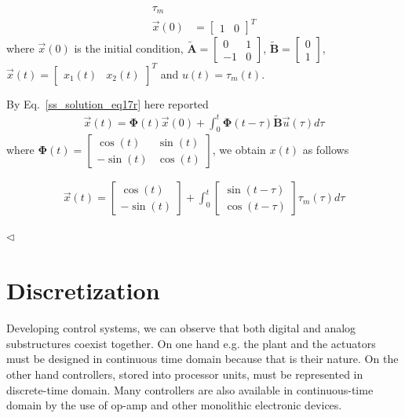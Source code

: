 \documentclass[12pt,a4paper,oneside]{book}
\begin{document}
\begin{onehalfspace}
\begin{example}
\begin{equation}
\begin{aligned}
		\tau_m \\[6pt]
		\vec{x}(0) &= \begin{bmatrix} 1 & 0 \end{bmatrix}^T
	\end{aligned}
\end{equation}
where $\vec{x}(0)$ is the initial condition, $\tilde{\mathbf{A}} = 
\begin{bmatrix} 0 
& 1 \\ -1 & 0 \end{bmatrix}$, $\tilde{\mathbf{B}} = \begin{bmatrix} 0 \\ 
1 \end{bmatrix}$, $\vec{x}(t)= \begin{bmatrix} x_1(t) & x_2(t) 
\end{bmatrix}^T$ and $u(t)= \tau_m(t)$.

By Eq.~\eqref{ss_solution_eq17r} here reported
\begin{equation}\label{ss_solution_eq17r}
	\begin{aligned}
		\vec{x}(t) = \mathbf{\Phi}(t) \vec{x}(0) + 
		\int_{0}^{t}\mathbf{\Phi}(t-\tau)\tilde{\mathbf{B}}\vec{u}(\tau)d\tau
	\end{aligned}
\end{equation}
where $\mathbf{\Phi}(t) = \begin{bmatrix} \cos(t) & \sin(t) \\ -\sin(t) & 
\cos(t) \end{bmatrix}$, we obtain $x(t)$ as follows
\begin{mybox}
\begin{equation}
	\begin{aligned}
		\vec{x}(t) = \begin{bmatrix} \cos(t) \\[6pt] -\sin(t) \end{bmatrix} + 
		\int_{0}^{t}\begin{bmatrix} \sin(t-\tau) \\[6pt] \cos(t-\tau) 
		\end{bmatrix}\tau_m(\tau)d\tau
	\end{aligned}
\end{equation}
\end{mybox}
$\triangleleft$
\end{example}


\section{Discretization}
Developing control systems, we can observe that both digital and analog 
substructures coexist together. On one hand e.g. the plant and the actuators 
must be designed in continuous time domain because that is their nature. On the 
other hand controllers, stored into processor units,  must be represented in 
discrete-time domain. Many controllers are also available in continuous-time 
domain by the use of op-amp and other monolithic electronic devices.


\end{onehalfspace}
\end{document}
